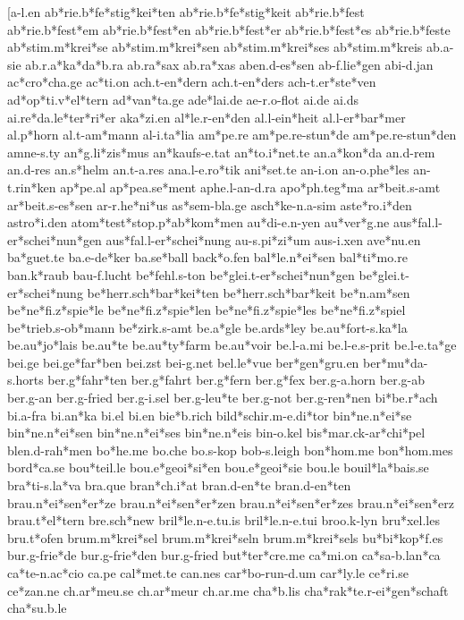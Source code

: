 [a-l.en
ab*rie.b*fe*stig*kei*ten
ab*rie.b*fe*stig*keit
ab*rie.b*fest
ab*rie.b*fest*em
ab*rie.b*fest*en
ab*rie.b*fest*er
ab*rie.b*fest*es
ab*rie.b*feste
ab*stim.m*krei*se
ab*stim.m*krei*sen
ab*stim.m*krei*ses
ab*stim.m*kreis
ab.a-sie
ab.r.a*ka*da*b.ra
ab.ra*sax
ab.ra*xas
aben.d-es*sen
ab-f.lie*gen
abi-d.jan
ac*cro*cha.ge
ac*ti.on
ach.t-en*dern
ach.t-en*ders
ach-t.er*ste*ven
ad*op*ti.v*el*tern
ad*van*ta.ge
ade*lai.de
ae-r.o-flot
ai.de
ai.ds
ai.re*da.le*ter*ri*er
aka*zi.en
al*le.r-en*den
al.l-ein*heit
al.l-er*bar*mer
al.p*horn
al.t-am*mann
al-i.ta*lia
am*pe.re
am*pe.re-stun*de
am*pe.re-stun*den
amne-s.ty
an*g.li*zis*mus
an*kaufs-e.tat
an*to.i*net.te
an.a*kon*da
an.d-rem
an.d-res
an.s*helm
an.t-a.res
ana.l-e.ro*tik
ani*set.te
an-i.on
an-o.phe*les
an-t.rin*ken
ap*pe.al
ap*pea.se*ment
aphe.l-an-d.ra
apo*ph.teg*ma
ar*beit.s-amt
ar*beit.s-es*sen
ar-r.he*ni*us
as*sem-bla.ge
asch*ke-n.a-sim
aste*ro.i*den
astro*i.den
atom*test*stop.p*ab*kom*men
au*di-e.n-yen
au*ver*g.ne
aus*fal.l-er*schei*nun*gen
aus*fal.l-er*schei*nung
au-s.pi*zi*um
aus-i.xen
ave*nu.en
ba*guet.te
ba.e-de*ker
ba.se*ball
back*o.fen
bal*le.n*ei*sen
bal*ti*mo.re
ban.k*raub
bau-f.lucht
be*fehl.s-ton
be*glei.t-er*schei*nun*gen
be*glei.t-er*schei*nung
be*herr.sch*bar*kei*ten
be*herr.sch*bar*keit
be*n.am*sen
be*ne*fi.z*spie*le
be*ne*fi.z*spie*len
be*ne*fi.z*spie*les
be*ne*fi.z*spiel
be*trieb.s-ob*mann
be*zirk.s-amt
be.a*gle
be.ards*ley
be.au*fort-s.ka*la
be.au*jo*lais
be.au*te
be.au*ty*farm
be.au*voir
be.l-a.mi
be.l-e.s-prit
be.l-e.ta*ge
bei.ge
bei.ge*far*ben
bei.zst
bei-g.net
bel.le*vue
ber*gen*gru.en
ber*mu*da-s.horts
ber.g*fahr*ten
ber.g*fahrt
ber.g*fern
ber.g*fex
ber.g-a.horn
ber.g-ab
ber.g-an
ber.g-fried
ber.g-i.sel
ber.g-leu*te
ber.g-not
ber.g-ren*nen
bi*be.r*ach
bi.a-fra
bi.an*ka
bi.el
bi.en
bie*b.rich
bild*schir.m-e.di*tor
bin*ne.n*ei*se
bin*ne.n*ei*sen
bin*ne.n*ei*ses
bin*ne.n*eis
bin-o.kel
bis*mar.ck-ar*chi*pel
blen.d-rah*men
bo*he.me
bo.che
bo.s-kop
bob-s.leigh
bon*hom.me
bon*hom.mes
bord*ca.se
bou*teil.le
bou.e*geoi*si*en
bou.e*geoi*sie
bou.le
bouil*la*bais.se
bra*ti-s.la*va
bra.que
bran*ch.i*at
bran.d-en*te
bran.d-en*ten
brau.n*ei*sen*er*ze
brau.n*ei*sen*er*zen
brau.n*ei*sen*er*zes
brau.n*ei*sen*erz
brau.t*el*tern
bre.sch*new
bril*le.n-e.tu.is
bril*le.n-e.tui
broo.k-lyn
bru*xel.les
bru.t*ofen
brum.m*krei*sel
brum.m*krei*seln
brum.m*krei*sels
bu*bi*kop*f.es
bur.g-frie*de
bur.g-frie*den
bur.g-fried
but*ter*cre.me
ca*mi.on
ca*sa-b.lan*ca
ca*te-n.ac*cio
ca.pe
cal*met.te
can.nes
car*bo-run-d.um
car*ly.le
ce*ri.se
ce*zan.ne
ch.ar*meu.se
ch.ar*meur
ch.ar.me
cha*b.lis
cha*rak*te.r-ei*gen*schaft
cha*su.b.le
